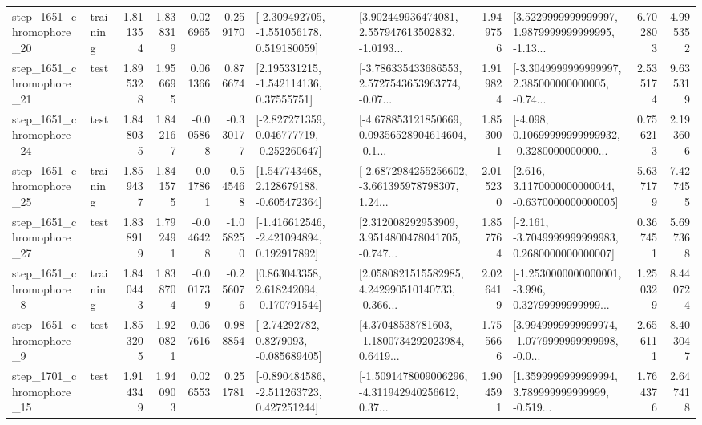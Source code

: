 \begin{tabular}{llrrrrllrlrr}
 step\_1651\_chromophore\_20 &  training &      1.811354 &    1.838319 &      0.026965 &  0.259170 &   [-2.309492705, -1.551056178, 0.519180059] &  [3.902449936474081, 2.557947613502832, -1.0193... &       1.949756 &  [3.5229999999999997, 1.9879999999999995, -1.13... &            6.702803 &          4.995352 \\
 step\_1651\_chromophore\_21 &      test &      1.895328 &    1.956695 &      0.061366 &  0.876674 &     [2.195331215, -1.542114136, 0.37555751] &  [-3.786335433686553, 2.5727543653963774, -0.07... &       1.919824 &  [-3.3049999999999997, 2.385000000000005, -0.74... &            2.535174 &          9.635319 \\
 step\_1651\_chromophore\_24 &      test &      1.848035 &    1.842167 &     -0.005868 & -0.330177 &   [-2.827271359, 0.046777719, -0.252260647] &  [-4.678853121850669, 0.09356528904614604, -0.1... &       1.853001 &  [-4.098, 0.10699999999999932, -0.3280000000000... &            0.756213 &          2.193606 \\
 step\_1651\_chromophore\_25 &  training &      1.859437 &    1.841575 &     -0.017861 & -0.545468 &    [1.547743468, 2.128679188, -0.605472364] &  [-2.6872984255256602, -3.661395978798307, 1.24... &       2.015230 &   [2.616, 3.1170000000000044, -0.6370000000000005] &            5.637179 &          7.427455 \\
 step\_1651\_chromophore\_27 &      test &      1.838919 &    1.792491 &     -0.046428 & -1.058250 &   [-1.416612546, -2.421094894, 0.192917892] &  [2.312008292953909, 3.9514800478041705, -0.747... &       1.857764 &  [-2.161, -3.7049999999999983, 0.2680000000000007] &            0.367451 &          5.697368 \\
  step\_1651\_chromophore\_8 &  training &      1.840443 &    1.838704 &     -0.001739 & -0.256076 &    [0.863043358, 2.618242094, -0.170791544] &  [2.0580821515582985, 4.242990510140733, -0.366... &       2.026419 &  [-1.2530000000000001, -3.996, 0.32799999999999... &            1.250329 &          8.440724 \\
  step\_1651\_chromophore\_9 &      test &      1.853205 &    1.920821 &      0.067616 &  0.988854 &      [-2.74292782, 0.8279093, -0.085689405] &  [4.37048538781603, -1.1800734292023984, 0.6419... &       1.755666 &  [3.9949999999999974, -1.0779999999999998, -0.0... &            2.656111 &          8.403047 \\
 step\_1701\_chromophore\_15 &      test &      1.914349 &    1.940903 &      0.026553 &  0.251781 &   [-0.890484586, -2.511263723, 0.427251244] &  [-1.5091478009006296, -4.311942940256612, 0.37... &       1.904591 &  [1.3599999999999994, 3.789999999999999, -0.519... &            1.764376 &          2.647418 \\

\end{tabular}
